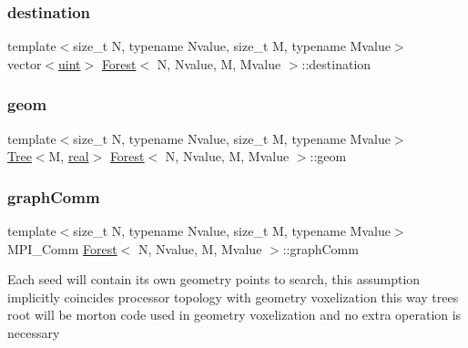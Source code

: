 \mbox{\label{classForest_a1bb5dceeeda8307effdfb5e261fcc634}} 
\subsubsection{\texorpdfstring{destination}{destination}}
{\footnotesize\ttfamily template$<$size\+\_\+t N, typename Nvalue, size\+\_\+t M, typename Mvalue$>$ \\
vector$<$\mbox{\hyperlink{definitions_8h_a69aa29b598b851b0640aa225a9e5d61d}{uint}}$>$ \mbox{\hyperlink{classForest}{Forest}}$<$ N, Nvalue, M, Mvalue $>$\+::destination\hspace{0.3cm}{\ttfamily [private]}}

\mbox{\label{classForest_a4002149b64e8a87b94811ea2acbce4f4}} 
\subsubsection{\texorpdfstring{geom}{geom}}
{\footnotesize\ttfamily template$<$size\+\_\+t N, typename Nvalue, size\+\_\+t M, typename Mvalue$>$ \\
\mbox{\hyperlink{classTree}{Tree}}$<$M, \mbox{\hyperlink{definitions_8h_aedc0ad84d1e764530814f57ad931d02a}{real}}$>$ \mbox{\hyperlink{classForest}{Forest}}$<$ N, Nvalue, M, Mvalue $>$\+::geom\hspace{0.3cm}{\ttfamily [private]}}

\mbox{\label{classForest_ad6b1077285024b63e72da29b844b9cce}} 
\subsubsection{\texorpdfstring{graph\+Comm}{graphComm}}
{\footnotesize\ttfamily template$<$size\+\_\+t N, typename Nvalue, size\+\_\+t M, typename Mvalue$>$ \\
M\+P\+I\+\_\+\+Comm \mbox{\hyperlink{classForest}{Forest}}$<$ N, Nvalue, M, Mvalue $>$\+::graph\+Comm\hspace{0.3cm}{\ttfamily [private]}}

Each seed will contain its own geometry points to search, this assumption implicitly coincides processor topology with geometry voxelization this way tree\textquotesingle{}s root will be morton code used in geometry voxelization and no extra operation is necessary \mbox{\label{classForest_af84a901b60f3d4d9e14c68560f8a2a29}} 
